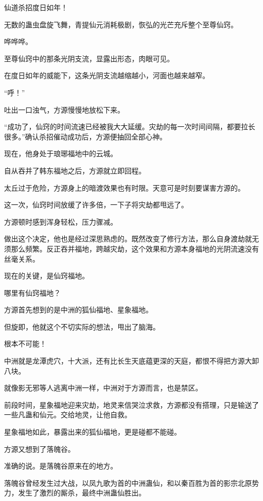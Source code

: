 
\begin{this_body}

仙道杀招度日如年！

无数的蛊虫盘旋飞舞，青提仙元消耗极剧，恢弘的光芒充斥整个至尊仙窍。

哗哗哗。

至尊仙窍中的那条光阴支流，显露出形态，肉眼可见。

在度日如年的威能下，这条光阴支流越缩越小，河面也越来越窄。

“呼！”

吐出一口浊气，方源慢慢地放松下来。

“成功了，仙窍的时间流速已经被我大大延缓。灾劫的每一次时间间隔，都要拉长很多。”确认杀招催动成功后，方源便抽回全部心神。

现在，他身处于琅琊福地中的云城。

自从吞并了韩东福地之后，方源就立即回程。

太丘过于危险，方源身上的暗渡效果也有时限。天意可是时刻要谋害方源的。

这一次，仙窍时间放缓了许多倍，一下子将灾劫都甩远了。

方源顿时感到浑身轻松，压力骤减。

做出这个决定，他也是经过深思熟虑的。既然改变了修行方法，那么自身渡劫就无须那么频繁。反正吞并福地，跨越灾劫，这个效果和方源本身福地的光阴流速没有丝毫关系。

现在的关键，是仙窍福地。

哪里有仙窍福地？

方源首先想到的是中洲的狐仙福地、星象福地。

但旋即，他就这个不切实际的想法，甩出了脑海。

根本不可能！

中洲就是龙潭虎穴，十大派，还有比长生天底蕴更深的天庭，都恨不得把方源大卸八块。

就像影无邪等人逃离中洲一样，中洲对于方源而言，也是禁区。

前段时间，星象福地迎来灾劫，地灵来信哭泣求救，方源都没有搭理，只是输送了一些凡蛊和仙元。交给地灵，让他自救。

星象福地如此，暴露出来的狐仙福地，更是碰都不能碰。

方源又想到了落魄谷。

准确的说。是落魄谷原来在的地方。

落魄谷曾经发生过大战，以凤九歌为首的中洲蛊仙，和以秦百胜为首的影宗北原势力，发生了激烈的厮杀，最终中洲蛊仙胜出。


\end{this_body}
